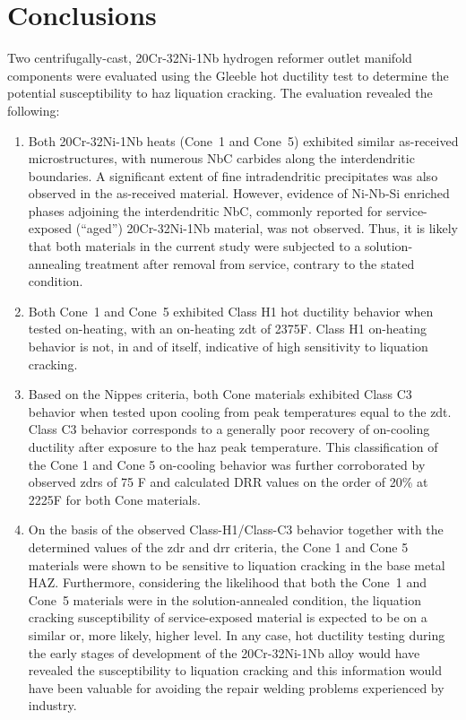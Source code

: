 \chapter{Conclusions} \label{ch:conclusions}
Two centrifugally-cast, 20Cr-32Ni-1Nb hydrogen reformer outlet manifold components were evaluated using the Gleeble\texttrademark{} hot ductility test to determine the potential susceptibility to \gls{haz} liquation cracking.  The evaluation revealed the following:

\begin{enumerate}
\item Both 20Cr-32Ni-1Nb heats (Cone~1 and Cone~5) exhibited similar as-received microstructures, with numerous NbC carbides along the interdendritic boundaries. A significant extent of fine intradendritic precipitates was also observed in the as-received material. However, evidence of Ni-Nb-Si enriched phases adjoining the interdendritic NbC, commonly reported for service-exposed (“aged”) 20Cr-32Ni-1Nb material, was not observed. Thus, it is likely that both materials in the current study were subjected to a solution-annealing treatment after removal from service, contrary to the stated condition.
\item Both Cone~1 and Cone~5 exhibited Class H1 hot ductility behavior when tested on-heating, with an on-heating \gls{zdt} of 2375\textdegree{}F. Class H1 on-heating behavior is not, in and of itself, indicative of high sensitivity to liquation cracking.
\item Based on the Nippes criteria, both Cone materials exhibited Class C3 behavior when tested upon cooling from peak temperatures equal to the \gls{zdt}.  Class C3 behavior corresponds to a generally poor recovery of on-cooling ductility after exposure to the \gls{haz} peak temperature.  This classification of the Cone 1 and Cone 5 on-cooling behavior was further corroborated by observed \gls{zdr}s of 75 F\textdegree{} and calculated DRR values on the order of 20\% at 2225\textdegree{}F for both Cone materials.
\item On the basis of the observed Class-H1/Class-C3 behavior together with the determined values of the \gls{zdr} and \gls{drr} criteria, the Cone 1 and Cone 5 materials were shown to be sensitive to liquation cracking in the base metal HAZ. Furthermore, considering the likelihood that both the Cone~1 and Cone~5 materials were in the solution-annealed condition, the liquation cracking susceptibility of service-exposed material is expected to be on a similar or, more likely, higher level. In any case, hot ductility testing during the early stages of development of the 20Cr-32Ni-1Nb alloy would have revealed the susceptibility to liquation cracking and this information would have been valuable for avoiding the repair welding problems experienced by industry.

\end{enumerate}
